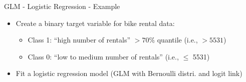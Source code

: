 \documentclass[10pt,compress,t,notes=noshow, xcolor=table]{beamer}
\begin{document}
\begin{frame}{GLM - Logistic Regression - Example}

\begin{itemize}
    \item Create a binary target variable for bike rental data:
    \begin{itemize}
        \item Class 1: ``high number of rentals'' $>70\%$ quantile (i.e.,  $> 5531$)
        \item Class 0: ``low to medium number of rentals'' (i.e.,  $\leq$ 5531)
    \end{itemize}
    \item Fit a logistic regression model (GLM with Bernoulli distri. and logit link)
\end{itemize}


\end{frame}
\end{document}
